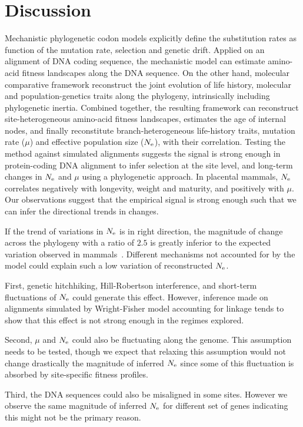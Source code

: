 \section{Discussion}
\label{sec:Discussion}
Mechanistic phylogenetic codon models explicitly define the substitution rates as function of the mutation rate, selection and genetic drift.
Applied on an alignment of \acrshort{DNA} coding sequence, the mechanistic model can estimate amino-acid fitness landscapes along the \acrshort{DNA} sequence.
On the other hand, molecular comparative framework reconstruct the joint evolution of life history, molecular and population-genetics traits along the phylogeny, intrinsically including phylogenetic inertia.
Combined together, the resulting framework can reconstruct site-heterogeneous amino-acid fitness landscapes, estimates the age of internal nodes, and finally reconstitute branch-heterogeneous life-history traits, mutation rate ($\mu$) and effective population size ($N_{\mathrm{e}}$), with their correlation.
Testing the method against simulated alignments suggests the signal is strong enough in protein-coding \acrshort{DNA} alignment to infer selection at the site level, and long-term changes in $N_{\mathrm{e}}$ and $\mu$ using a phylogenetic approach.
In placental mammals, $N_{\mathrm{e}}$ correlates negatively with longevity, weight and maturity, and positively with $\mu$.
Our observations suggest that the empirical signal is strong enough such that we can infer the directional trends in changes.

If the trend of variations in $N_{\mathrm{e}}$ is in right direction, the magnitude of change across the phylogeny with a ratio of $2.5$ is greatly inferior to the expected variation observed in mammals~\citep{Galtier2016}.
Different mechanisms not accounted for by the model could explain such a low variation of reconstructed $N_{\mathrm{e}}$.

First, genetic hitchhiking, Hill-Robertson interference, and short-term fluctuations of $N_{\mathrm{e}}$ could generate this effect.
However, inference made on alignments simulated by Wright-Fisher model accounting for linkage tends to show that this effect is not strong enough in the regimes explored.

Second, $\mu$ and $N_{\mathrm{e}}$ could also be fluctuating along the genome.
This assumption needs to be tested, though we expect that relaxing this assumption would not change drastically the magnitude of inferred $N_{\mathrm{e}}$ since some of this fluctuation is absorbed by site-specific fitness profiles.

Third, the \acrshort{DNA} sequences could also be misaligned in some sites.
However we observe the same magnitude of inferred $N_{\mathrm{e}}$ for different set of genes indicating this might not be the primary reason.

